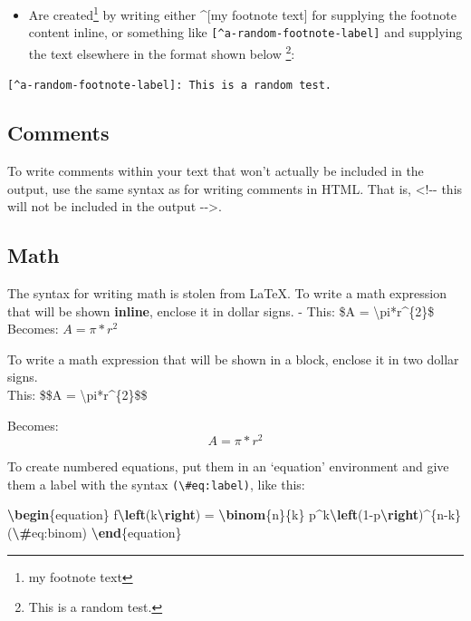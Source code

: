 \documentclass[a4paper, nobind]{templates/ociamthesis}
\providecommand{\tightlist}{%
  \setlength{\itemsep}{0pt}\setlength{\parskip}{0pt}}
\newenvironment{Shaded}{\begin{snugshade}}{\end{snugshade}}
\newcommand{\ExtensionTok}[1]{#1}
\newcommand{\KeywordTok}[1]{\textcolor[rgb]{0.13,0.29,0.53}{\textbf{#1}}}
\newcommand{\NormalTok}[1]{#1}
\newcommand{\SpecialCharTok}[1]{\textcolor[rgb]{0.81,0.36,0.00}{\textbf{#1}}}
\newcommand{\SpecialStringTok}[1]{\textcolor[rgb]{0.31,0.60,0.02}{#1}}
\renewenvironment{Shaded}
{
  \vspace{10pt}%
  \begin{snugshade}%
}{%
  \end{snugshade}%
  \vspace{8pt}%
}
\begin{document}
\begin{itemize}
\tightlist
\item
  Are created\footnote{my footnote text} by writing either \^{}{[}my footnote text{]} for supplying the footnote content inline, or something like \texttt{{[}\^{}a-random-footnote-label{]}} and supplying the text elsewhere in the format shown below \footnote{This is a random test.}:
\end{itemize}

\texttt{{[}\^{}a-random-footnote-label{]}:\ This\ is\ a\ random\ test.}

\subsection{Comments}\label{comments}

To write comments within your text that won't actually be included in the output, use the same syntax as for writing comments in HTML. That is, \textless!-\/- this will not be included in the output -\/-\textgreater.

\subsection{Math}\label{math}

The syntax for writing math is stolen from LaTeX. To write a math expression that will be shown \textbf{inline}, enclose it in dollar signs.
- This: \$A = \textbackslash pi*r\^{}\{2\}\$ Becomes: \(A = \pi*r^{2}\)

To write a math expression that will be shown in a block, enclose it in two dollar signs.\\
This: \$\$A = \textbackslash pi*r\^{}\{2\}\$\$

Becomes:
\[A = \pi*r^{2}\]

To create numbered equations, put them in an `equation' environment and give them a label with the syntax \texttt{(\textbackslash{}\#eq:label)}, like this:

\begin{Shaded}
\begin{Highlighting}[]
\KeywordTok{\textbackslash{}begin}\NormalTok{\{}\ExtensionTok{equation}\NormalTok{\}}\SpecialStringTok{ }
\SpecialStringTok{  f}\SpecialCharTok{\textbackslash{}left}\SpecialStringTok{(k}\SpecialCharTok{\textbackslash{}right}\SpecialStringTok{) = }\SpecialCharTok{\textbackslash{}binom}\SpecialStringTok{\{n\}\{k\} p\^{}k}\SpecialCharTok{\textbackslash{}left}\SpecialStringTok{(1{-}p}\SpecialCharTok{\textbackslash{}right}\SpecialStringTok{)\^{}\{n{-}k\}}
\SpecialStringTok{  (}\SpecialCharTok{\textbackslash{}\#}\SpecialStringTok{eq:binom)}
\KeywordTok{\textbackslash{}end}\NormalTok{\{}\ExtensionTok{equation}\NormalTok{\} }
\end{Highlighting}
\end{Shaded}
\end{document}
